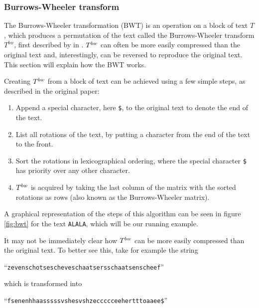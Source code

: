 \subsubsection{Burrows-Wheeler transform} \label{section:background_bwt}

The Burrows-Wheeler transformation (BWT) is an operation on a block of text $T$, which produces a permutation of the text called the Burrows-Wheeler transform $T^{bw}$, first described by \citeauthor{burrows_block-sorting_1994} in \citeyear{burrows_block-sorting_1994} \cite{burrows_block-sorting_1994}.
$T^{bw}$ can often be more easily compressed than the original text and, interestingly, can be reversed to reproduce the original text.
This section will explain how the BWT works.

Creating $T^{bw}$ from a block of text can be achieved using a few simple steps, as described in the original paper:

\begin{enumerate}
  \item Append a special character, here \texttt{\$}, to the original text to denote the end of the text.
  \item List all rotations of the text, by putting a character from the end of the text to the front.
  \item Sort the rotations in lexicographical ordering, where the special character \texttt{\$} has priority over any other character.
  \item $T^{bw}$ is acquired by taking the last column of the matrix with the sorted rotations as rows (also known as the Burrows-Wheeler matrix).
\end{enumerate}

A graphical representation of the steps of this algorithm can be seen in figure \ref{fig:bwt} for the text \texttt{ALALA}, which will be our running example.

It may not be immediately clear how $T^{bw}$ can be more easily compressed than the original text.
To better see this, take for example the string

\begin{center}
  ``\texttt{zeven\textvisiblespace schotse\textvisiblespace scheve\textvisiblespace schaatsers\textvisiblespace schaatsen\textvisiblespace scheef}''
\end{center}

which is transformed into

\begin{center}
  ``\texttt{fsenenhhaasssssvshesvshzeccccceeher\textvisiblespace\textvisiblespace\textvisiblespace\textvisiblespace\textvisiblespace tttoaaee\$}''
\end{center}

